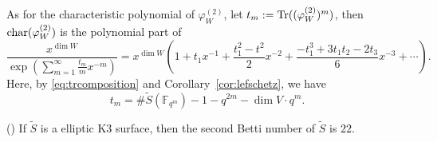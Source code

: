 \documentclass[main]{subfiles}
\begin{document}
As for the characteristic polynomial of $\varphi^{(2)}_{W}$, let $t_{m} := \operatorname{Tr}((\varphi^{(2)}_{W})^{m})$, then $\operatorname{char} (\varphi^{(2)}_{W})$ is the polynomial part of
\begin{equation}
    \label{eq:charaW}
    \frac{x^{\dim W}}{\exp \left( \sum_{m = 1}^{\infty} \frac{t_{m}}{m} x^{-m} \right)} = x^{\dim W} \left( 1 + t_{1} x^{-1} + \frac{t_{1}^{2} - t^{2}}{2} x^{-2} + \frac{-t_{1}^{3} + 3 t_{1} t_{2} - 2 t_{3}}{6} x^{-3} + \cdots \right).
\end{equation}
Here, by \eqref{eq:trcomposition} and Corollary~\ref{cor:lefschetz}, we have
\begin{equation}
    \label{eq:tm}
    t_{m} = \# \tilde{S}(\mathbb{F}_{q^{m}}) - 1 - q^{2m} - \dim V \cdot q^{m}.
\end{equation}

\begin{lem}{(\cite[Theorem 4, Part III]{ref:mumford2004})}
    \label{lem:k3-betti}
    If $\tilde{S}$ is a elliptic K3 surface, then the second Betti number of $\tilde{S}$ is $22$.
\end{lem}
\end{document}
